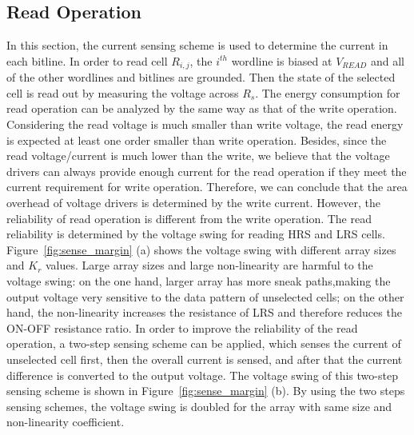\subsection{Read Operation}
In this section, the current sensing scheme is used to determine the current in each bitline. In order to read cell $R_{i,j}$, the $i^{th}$ wordline is biased at $V_{READ}$ and all of the other wordlines and bitlines are grounded. Then the state of the selected cell is read out by measuring the voltage across $R_s$. The energy consumption for read operation can be analyzed by the same way as that of the write operation. Considering the read voltage is much smaller than write voltage, the read energy is expected at least one order smaller than write operation. Besides, since the read voltage/current is much lower than the write, we believe that the voltage drivers can always provide enough current for the read operation if they meet the current requirement for write operation. Therefore, we can conclude that the area overhead of voltage drivers is determined by the write current. However, the reliability of read operation is different from the write operation. The read reliability is determined by the voltage swing for reading HRS and LRS cells. Figure~\ref{fig:sense_margin} (a) shows the voltage swing with different array sizes and $K_r$ values. Large array sizes and large non-linearity are harmful to the voltage swing: on the one hand, larger array has more sneak paths,making the output voltage very sensitive to the data pattern of unselected cells; on the other hand, the non-linearity increases the resistance of LRS and therefore reduces the ON-OFF resistance ratio. In order to improve the reliability of the read operation, a two-step sensing scheme can be applied, which senses the current of unselected cell first, then the overall current is sensed, and after that the current difference is converted to the output voltage. The voltage swing of this two-step sensing scheme is shown in Figure~\ref{fig:sense_margin} (b). By using the two steps sensing schemes, the voltage swing is doubled for the array with same size and non-linearity coefficient.

%

